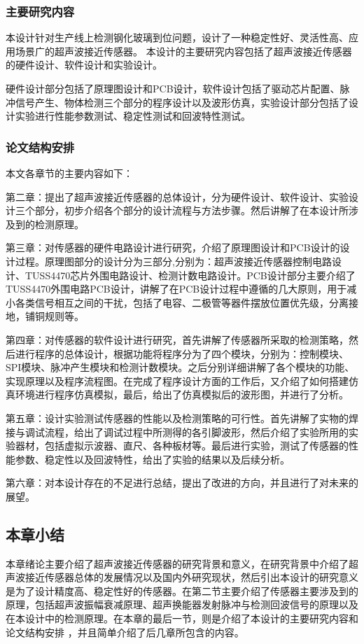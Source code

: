 \subsubsection{主要研究内容}
本设计针对生产线上检测钢化玻璃到位问题，设计了一种稳定性好、灵活性高、应用场景广的超声波接近传感器。
本设计的主要研究内容包括了超声波接近传感器的硬件设计、软件设计和实验设计。\par
硬件设计部分包括了原理图设计和PCB设计，软件设计包括了驱动芯片配置、脉冲信号产生、物体检测三个部分的程序设计以及波形仿真，实验设计部分包括了设计实验进行性能参数测试、稳定性测试和回波特性测试。

\subsubsection{论文结构安排}
本文各章节的主要内容如下：

第二章：提出了超声波接近传感器的总体设计，分为硬件设计、软件设计、实验设计三个部分，初步介绍各个部分的设计流程与方法步骤。然后讲解了在本设计所涉及到的检测原理。

第三章：对传感器的硬件电路设计进行研究，介绍了原理图设计和PCB设计的设计过程。原理图部分的设计分为三部分,分别为：超声波接近传感器控制电路设计、TUSS4470芯片外围电路设计、检测计数电路设计。PCB设计部分主要介绍了TUSS4470外围电路PCB设计，讲解了在PCB设计过程中遵循的几大原则，用于减小各类信号相互之间的干扰，包括了电容、二极管等器件摆放位置优先级，分离接地，铺铜规则等。

第四章：对传感器的软件设计进行研究，首先讲解了传感器所采取的检测策略，然后进行程序的总体设计，根据功能将程序分为了四个模块，分别为：控制模块、SPI模块、脉冲产生模块和检测计数模块。之后分别详细讲解了各个模块的功能、实现原理以及程序流程图。在完成了程序设计方面的工作后，又介绍了如何搭建仿真环境进行程序仿真模拟，最后，给出了仿真模拟后的波形图，并进行了分析。

第五章：设计实验测试传感器的性能以及检测策略的可行性。首先讲解了实物的焊接与调试流程，给出了调试过程中所测得的各引脚波形，然后介绍了实验所用的实验器材，包括虚拟示波器、直尺、各种板材等。最后进行实验，测试了传感器的性能参数、稳定性以及回波特性，给出了实验的结果以及后续分析。

第六章：对本设计存在的不足进行总结，提出了改进的方向，并且进行了对未来的展望。


    \subsection{本章小结}
    本章绪论主要介绍了超声波接近传感器的研究背景和意义，在研究背景中介绍了超声波接近传感器总体的发展情况以及国内外研究现状，然后引出本设计的研究意义是为了设计精度高、稳定性好的传感器。在第二节主要介绍了传感器主要涉及到的原理，包括超声波振幅衰减原理、超声换能器发射脉冲与检测回波信号的原理以及在本设计中的检测原理。在本章的最后一节，则是介绍了本设计的主要研究内容和论文结构安排
    ，并且简单介绍了后几章所包含的内容。